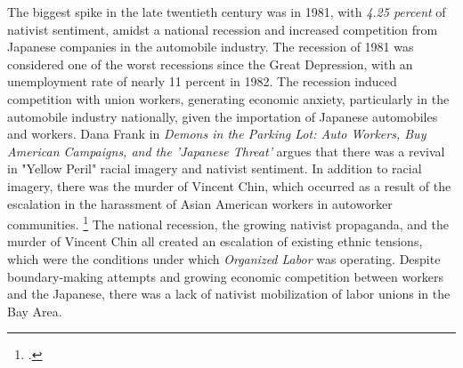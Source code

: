 \documentclass[12pt,a4paper]{article}
\begin{document}
The biggest spike in the late twentieth century was in 1981, with \textit{4.25 percent} of nativist sentiment, amidst a national recession and increased competition from Japanese companies in the automobile industry.  The recession of 1981 was considered one of the worst recessions since the Great Depression, with an unemployment rate of nearly 11 percent in 1982. The recession induced competition with union workers, generating economic anxiety, particularly in the automobile industry nationally, given the importation of Japanese automobiles and workers. Dana Frank in \textit{Demons in the Parking Lot: Auto Workers, Buy American Campaigns, and the 'Japanese Threat'} argues that there was a revival in "Yellow Peril" racial imagery and nativist sentiment. In addition to racial imagery, there was the murder of Vincent Chin, which occurred as a result of the escalation in the harassment of Asian American workers in autoworker communities. \footcite{frank_where_2003} The national recession, the growing nativist propaganda, and the murder of Vincent Chin all created an escalation of existing ethnic tensions, which were the conditions under which \textit{Organized Labor} was operating. Despite boundary-making attempts and growing economic competition between workers and the Japanese, there was a lack of nativist mobilization of labor unions in the Bay Area.  
\end{document}

